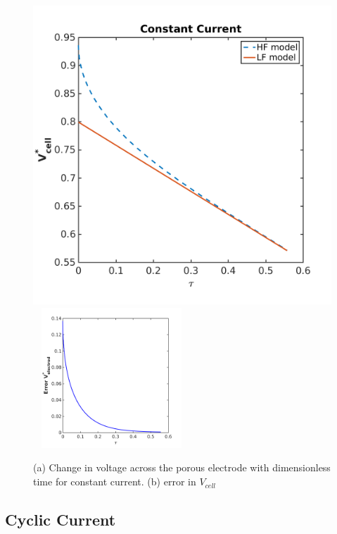 \documentclass[]{article}
\begin{document}
\begin{figure}[h]
    \centering
    \includegraphics[trim = 0in 0in 0in 0in, clip, width=.47\textwidth]{figures/Vcell.png}      
    ~
    \includegraphics[trim = 0in 0in 0in 0in, clip, width=0.47\textwidth]{figures/Error_V_const.png} 
    \caption{(a) Change in voltage across the porous electrode with dimensionless time for constant current. (b) error in $V_{cell}$}
    \label{fig:Vcell}
\end{figure}



\clearpage
\subsection{Cyclic Current}
\end{document}

